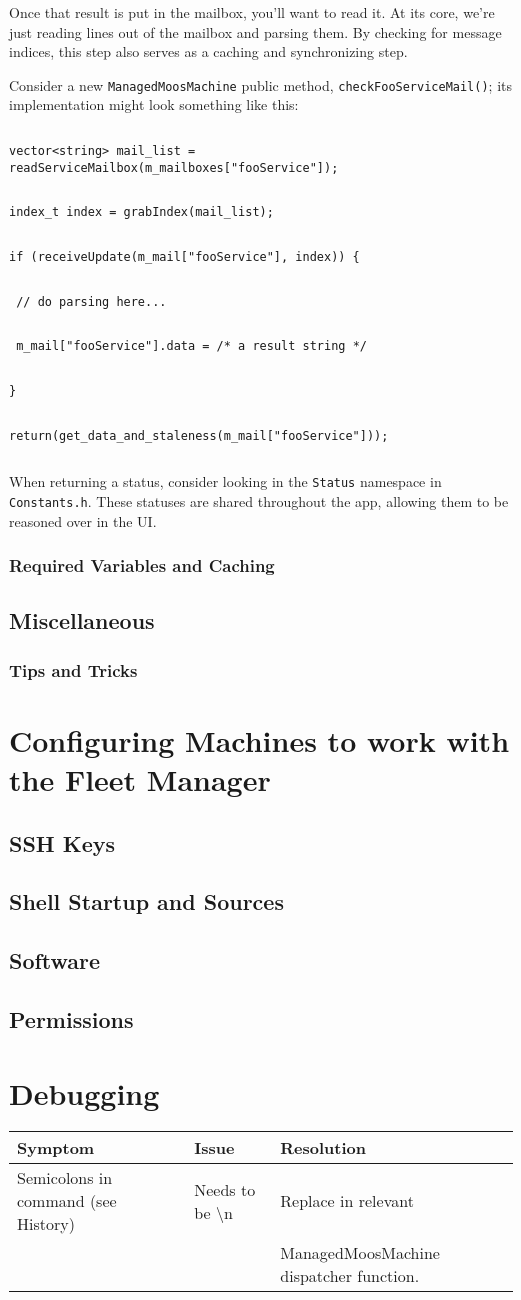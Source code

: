 \documentclass[11pt]{article}
\newcommand{\cmdline}[1]{\vspace{.2em} $\:$\\ \begin{minipage}{\dimexpr\textwidth-2cm}
\texttt{#1}
\end{minipage} $\:$\\ \vspace{-.2em} }
\begin{document}
Once that result is put in the mailbox, you'll want to read it. At its core, we're just reading lines out of the mailbox and parsing them. By checking for message indices, this step also serves as a caching and synchronizing step.

Consider a new \texttt{ManagedMoosMachine} public method, \texttt{checkFooServiceMail()}; its implementation might look something like this:

\cmdline{vector<string> mail\_list = readServiceMailbox(m\_mailboxes["fooService"]);}
\cmdline{index\_t index = grabIndex(mail\_list);}
\cmdline{if (receiveUpdate(m\_mail["fooService"], index)) \{}
\cmdline{	// do parsing here...}
\cmdline{	m\_mail["fooService"].data = /* a result string */}
\cmdline{\}}
\cmdline{return(get\_data\_and\_staleness(m\_mail["fooService"]));}

When returning a status, consider looking in the \texttt{Status} namespace in \texttt{Constants.h}. These statuses are shared throughout the app, allowing them to be reasoned over in the UI. 

\subsubsection{Required Variables and Caching}
\subsection{Miscellaneous}
\subsubsection{Tips and Tricks}
\section{Configuring Machines to work with the Fleet Manager}
\subsection{SSH Keys}
\subsection{Shell Startup and Sources}
\subsection{Software}
\subsection{Permissions}
\section{Debugging}
\begin{tabular}{l|l|l}
Symptom & Issue & Resolution\\
\hline
Semicolons in command (see History) & Needs to be {\textbackslash}n & Replace in relevant\\&& ManagedMoosMachine dispatcher function.
\end{tabular}
\end{document}
